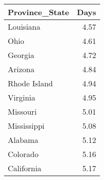 \begin{tabular}{lr}
\toprule
Province\_State &  Days \\
\midrule
     Louisiana &  4.57 \\
          Ohio &  4.61 \\
       Georgia &  4.72 \\
       Arizona &  4.84 \\
  Rhode Island &  4.94 \\
      Virginia &  4.95 \\
      Missouri &  5.01 \\
   Mississippi &  5.08 \\
       Alabama &  5.12 \\
      Colorado &  5.16 \\
    California &  5.17 \\
\bottomrule
\end{tabular}
